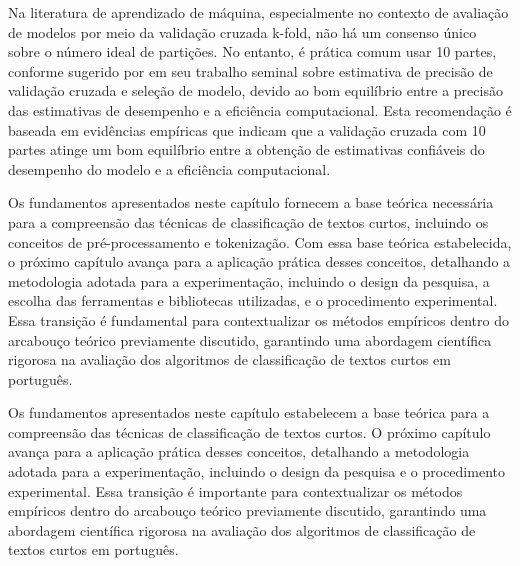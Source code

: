 Na literatura de aprendizado de máquina, especialmente no contexto de avaliação de modelos por meio da validação cruzada k-fold, não há um consenso único sobre o número ideal de partições. No entanto, é prática comum usar 10 partes, conforme sugerido por \cite{kohavi1995study} em seu trabalho seminal sobre estimativa de precisão de validação cruzada e seleção de modelo, devido ao bom equilíbrio entre a precisão das estimativas de desempenho e a eficiência computacional. Esta recomendação é baseada em evidências empíricas que indicam que a validação cruzada com 10 partes atinge um bom equilíbrio entre a obtenção de estimativas confiáveis do desempenho do modelo e a eficiência computacional.

Os fundamentos apresentados neste capítulo fornecem a base teórica necessária para a compreensão das técnicas de classificação de textos curtos, incluindo os conceitos de pré-processamento e tokenização. Com essa base teórica estabelecida, o próximo capítulo avança para a aplicação prática desses conceitos, detalhando a metodologia adotada para a experimentação, incluindo o design da pesquisa, a escolha das ferramentas e bibliotecas utilizadas, e o procedimento experimental. Essa transição é fundamental para contextualizar os métodos empíricos dentro do arcabouço teórico previamente discutido, garantindo uma abordagem científica rigorosa na avaliação dos algoritmos de classificação de textos curtos em português.

\noindent
Os fundamentos apresentados neste capítulo estabelecem a base teórica para a compreensão das técnicas de classificação de textos curtos. O próximo capítulo avança para a aplicação prática desses conceitos, detalhando a metodologia adotada para a experimentação, incluindo o design da pesquisa e o procedimento experimental. Essa transição é importante para contextualizar os métodos empíricos dentro do arcabouço teórico previamente discutido, garantindo uma abordagem científica rigorosa na avaliação dos algoritmos de classificação de textos curtos em português.



